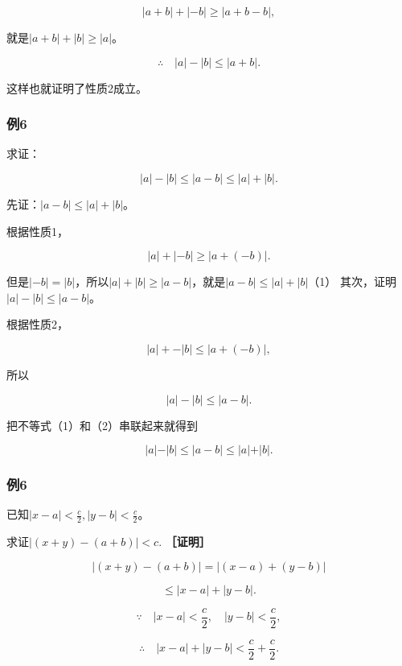 \[
\left| a + b \right| + \left| - b \right| \geqslant \left| a + b - b \right|,
\]

就是\(|a + b| + |b| \geqslant |a|\)。

\[
\therefore \quad | a | - | b | \leqslant | a + b |.
\]

这样也就证明了性质2成立。

\subsubsection{例6}

求证：

\[
\left| a \right| - \left| b \right| \leqslant \left| a - b \right| \leqslant \left| a \right| + \left| b \right|.
\]

 先证：\(|a-b|\leqslant|a|+|b|\)。

根据性质1，

\[
\left| a \right| + \left| - b \right| \geqslant \left| a + (- b) \right|.
\]

但是\(|-b|=|b|\)，所以\(|a|+|b|\geqslant|a-b|\)，就是\(|a - b|\leqslant |a| + |b|\)（1）
其次，证明\(|a| - |b| \leqslant |a - b|\)。

根据性质2，

\[
\vert a \vert + - \vert b \vert \leqslant \vert a + (- b) \vert,
\]

所以

\[
| a | - | b | \leqslant | a - b |. \tag {2}
\]

把不等式（1）和（2）串联起来就得到

\[
\vert a \vert - \vert b \vert \leqslant \vert a - b \vert \leqslant \vert a \vert + \vert b \vert.
\]

\subsubsection{例6}

已知\(|x - a| < \frac{c}{2}, |y - b| < \frac{c}{2}\)。

求证\(|(x + y) - (a + b)| < c.\) \textbf{［证明］}

\[
\left| (x + y) - (a + b) \right| = \left| (x - a) + (y - b) \right|
\]

\[
\leqslant | x - a | + | y - b |. \tag {1}
\]

\[
\because \quad | x - a | < \frac{c}{2}, \quad | y - b | < \frac{c}{2},
\]

\[
\therefore \quad | x - a | + | y - b | < \frac{c}{2} + \frac{c}{2}.
\]

